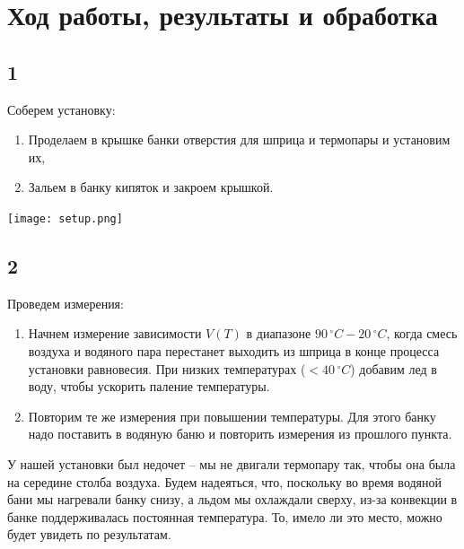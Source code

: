 \section*{Ход работы, результаты и обработка}
\subsection*{1}
Соберем установку:
\begin{enumerate}
	\item Проделаем в крышке банки отверстия для шприца и термопары и установим их,
	\item Зальем в банку кипяток и закроем крышкой.
\end{enumerate}
\begin{center}
	\texttt{[image: setup.png]}
\end{center}
\subsection*{2}
Проведем измерения:
\begin{enumerate}
	\item Начнем измерение зависимости $V(T)$ в диапазоне $90\,^\circ C-20\,^\circ C$, когда смесь воздуха и водяного пара перестанет выходить из шприца в конце процесса установки равновесия. При низких температурах ($<40\,^\circ C$) добавим лед в воду, чтобы ускорить паление температуры.
	\item Повторим те же измерения при повышении температуры. Для этого банку надо поставить в водяную баню и повторить измерения из прошлого пункта.
\end{enumerate}
У нашей установки был недочет -- мы не двигали термопару так, чтобы она была на середине столба воздуха. Будем надеяться, что, поскольку во время водяной бани мы нагревали банку снизу, а льдом мы охлаждали сверху, из-за конвекции в банке поддерживалась постоянная температура. То, имело ли это место, можно будет увидеть по результатам.\\

